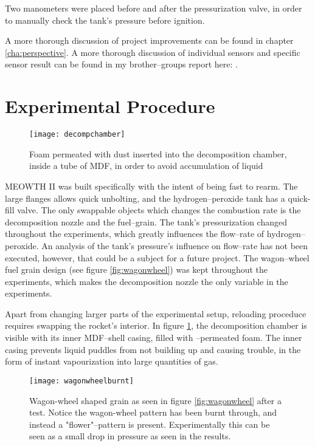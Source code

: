 	Two manometers were placed before and after the pressurization valve, in order to manually check the tank's pressure before ignition.

	A more thorough discussion of project improvements can be found in chapter \ref{cha:perspective}. A more thorough discussion of individual sensors and specific sensor result can be found in my brother--groups report here: \url{}.

	\section{Experimental Procedure}

	\begin{figure}
		\centering
		\texttt{[image: decompchamber]}
		\caption{Foam permeated with  dust inserted into the decomposition chamber, inside a tube of MDF, in order to avoid accumulation of liquid }
		\label{fig:kmno4foam2}
	\end{figure}

	MEOWTH II was built specifically with the intent of being fast to rearm. The large flanges allows quick unbolting, and the hydrogen--peroxide tank has a quick-fill valve. The only swappable objects which changes the combustion rate is the decomposition nozzle and the fuel--grain. The tank's pressurization changed throughout the experiments, which greatly influences the flow--rate of hydrogen--peroxide. An analysis of the tank's pressure's influence on flow--rate has not been executed, however, that could be a subject for a future project. The wagon--wheel fuel grain design (see figure \ref{fig:wagonwheel}) was kept throughout the experiments, which makes the decomposition nozzle the only variable in the experiments.

	Apart from changing larger parts of the experimental setup, reloading proceduce requires swapping the rocket's interior. In figure \ref{fig:kmno4foam2}, the decomposition chamber is visible with its inner MDF--shell casing, filled with --permeated foam. The inner casing prevents liquid puddles from not building up and causing trouble, in the form of instant vapourization into large quantities of gas.

	\begin{figure}
		\centering
		\texttt{[image: wagonwheelburnt]}
		\caption{Wagon-wheel shaped grain as seen in figure \ref{fig:wagonwheel} after a test. Notice the wagon-wheel pattern has been burnt through, and instead a "flower"--pattern is present. Experimentally this can be seen as a small drop in pressure as seen in the results.}
		\label{fig:burntgrain}
	\end{figure}

